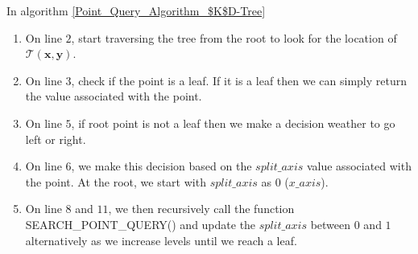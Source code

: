 In algorithm \ref{Point_Query_Algorithm_$K$D-Tree} 

\begin{enumerate}

    \item On line $2$, start traversing the tree from the root to look for the location of $\mathcal{T}(\boldsymbol{x}, \boldsymbol{y})$. 
    
    \item On line $3$, check if the point is a leaf. If it is a leaf then we can simply return the value associated with the point.
    
    \item On line $5$, if root point is not a leaf then we make a decision weather to go left or right.
    
    \item On line $6$, we make this decision based on the $split\_axis$ value associated with the point. At the root, we start with $split\_axis$ as $0$ ($x\_axis$). 
    
    \item On line $8$ and $11$, we then recursively call the function SEARCH\_POINT\_QUERY() and update the $split\_axis$ between $0$ and $1$ alternatively as we increase levels until we reach a leaf.

\end{enumerate}



